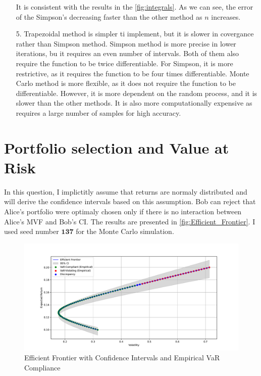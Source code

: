 \documentclass[a4paper,10pt,american]{article}
\begin{document}
\begin{enumerate}
    It is consistent with the results in the \autoref{fig:integrals}. As we can see, the error of the Simpson's decreasing faster than the other method as $n$ increases.

    \item [5.] Trapezoidal method is simpler ti implement, but it is slower in covergance rather than Simpson method. Simpson method is more precise in lower iterations, bu it requires an even number of intervals. Both of them also require the function to be twice differentiable. For Simpson, it is more restrictive, as it requires the function to be four times differentiable. Monte Carlo method is more flexible, as it does not require the function to be differentiable. However, it is more dependent on the random process, and it is slower than the other methods. It is also more computationally expensive as requires a large number of samples for high accuracy.
\end{enumerate}

\newpage
\section{Portfolio selection and Value at Risk}

In this question, I implictitly assume that returns are normaly distributed and will derive the confidence intervals based on this assumption. Bob can reject that Alice's portfolio were optimaly chosen only if there is no interaction between Alice's MVF and Bob's CI. The results are presented in \autoref{fig:Efficient_Frontier}. I used seed number $\boldsymbol{137}$ for the Monte Carlo simulation.
\begin{figure}[H]
    \centering
    \includegraphics[width=1\linewidth]{../Plots/Efficient_Frontier.pdf}
    \caption{Efficient Frontier with Confidence Intervals and Empirical VaR Compliance}
    \label{fig:Efficient_Frontier}
\end{figure}
\end{document}
